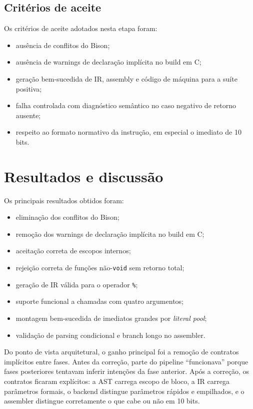 \documentclass[12pt,a4paper]{article}
\begin{document}
\subsection{Critérios de aceite}
Os critérios de aceite adotados nesta etapa foram:
\begin{itemize}[leftmargin=1.5em]
    \item ausência de conflitos do Bison;
    \item ausência de warnings de declaração implícita no build em C;
    \item geração bem-sucedida de IR, assembly e código de máquina para a suíte positiva;
    \item falha controlada com diagnóstico semântico no caso negativo de retorno ausente;
    \item respeito ao formato normativo da instrução, em especial o imediato de 10 bits.
\end{itemize}

\section{Resultados e discussão}
Os principais resultados obtidos foram:
\begin{itemize}[leftmargin=1.5em]
    \item eliminação dos conflitos do Bison;
    \item remoção dos warnings de declaração implícita no build em C;
    \item aceitação correta de escopos internos;
    \item rejeição correta de funções não-\texttt{void} sem retorno total;
    \item geração de IR válida para o operador \texttt{\%};
    \item suporte funcional a chamadas com quatro argumentos;
    \item montagem bem-sucedida de imediatos grandes por \emph{literal pool};
    \item validação de parsing condicional e branch longo no assembler.
\end{itemize}

Do ponto de vista arquitetural, o ganho principal foi a remoção de contratos implícitos entre fases. Antes da correção, parte do pipeline ``funcionava'' porque fases posteriores tentavam inferir intenções da fase anterior. Após a correção, os contratos ficaram explícitos: a AST carrega escopo de bloco, a IR carrega parâmetros formais, o backend distingue parâmetros rápidos e empilhados, e o assembler distingue corretamente o que cabe ou não em 10 bits.
\end{document}
